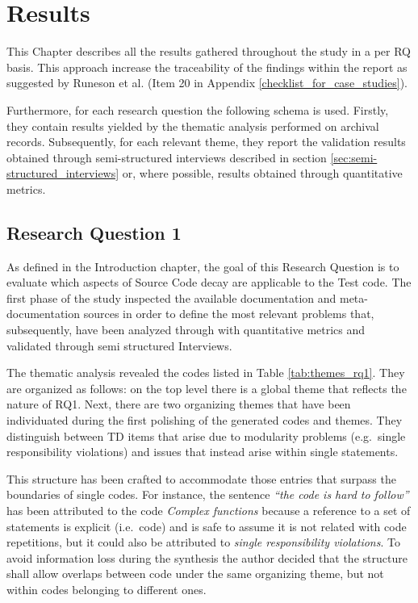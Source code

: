 \chapter{Results} \label{sec:study_results}

This Chapter describes all the results gathered throughout the study in a per RQ basis. This approach increase the traceability of the findings within the report as suggested by Runeson et al. \cite{case_study_software_engineering} (Item 20 in Appendix \ref{checklist_for_case_studies}).

Furthermore, for each research question the following schema is used. Firstly, they contain results yielded by the thematic analysis performed on archival records. Subsequently, for each relevant theme, they report the validation results obtained through semi-structured interviews described in section \ref{sec:semi-structured_interviews} or, where possible, results obtained through quantitative metrics.

\section{Research Question 1}

As defined in the Introduction chapter, the goal of this Research Question is to evaluate which aspects of Source Code decay are applicable to the Test code. The first phase of the study inspected the available documentation and meta-documentation sources in order to define the most relevant problems that, subsequently, have been analyzed through with quantitative metrics and validated through semi structured Interviews.

The thematic analysis revealed the codes listed in Table \ref{tab:themes_rq1}. They are organized as follows:  on the top level there is a global theme that reflects the nature of RQ1. Next, there are two organizing themes that have been individuated during the first polishing of the generated codes and themes. They distinguish between TD items that arise due to modularity problems (e.g.\ single responsibility violations) and issues that instead arise within single statements. 

This structure has been crafted to accommodate those entries that surpass the boundaries of single codes. For instance, the sentence \textit{``the code is hard to follow''} has been attributed to the code \textit{Complex functions} because a reference to a set of statements is explicit (i.e.\ code) and is safe to assume it is not related with code repetitions, but it could also be attributed to \textit{single responsibility violations}. To avoid information loss during the synthesis the author decided that the structure shall allow overlaps between code under the same organizing theme, but not within codes belonging to different ones. 

